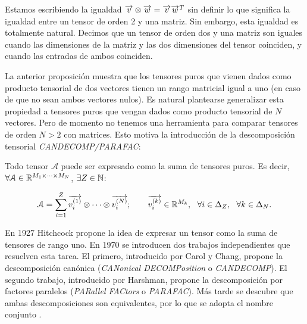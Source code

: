 \begin{observacion}
	Estamos escribiendo la igualdad $\overrightarrow{v} \otimes \overrightarrow{w} = \overrightarrow{v} \overrightarrow{w}^T$ sin definir lo que significa la igualdad entre un tensor de orden 2 y una matriz. Sin embargo, esta igualdad es totalmente natural. Decimos que un tensor de orden dos y una matriz son iguales cuando las dimensiones de la matriz y las dos dimensiones del tensor coinciden, y cuando las entradas de ambos coinciden.
\end{observacion}

La anterior proposición muestra que los tensores puros que vienen dados como producto tensorial de dos vectores tienen un rango matricial igual a uno (en caso de que no sean ambos vectores nulos). Es natural plantearse generalizar esta propiedad a tensores puros que vengan dados como producto tensorial de $N$ vectores. Pero de momento no tenemos una herramienta para comparar tensores de orden $N > 2$ con matrices. Esto motiva la introducción de la descomposición tensorial \textit{CANDECOMP/PARAFAC}:

\begin{proposicion} \label{proposicion:descomposicion_cp}
	Todo tensor $\mathcal{A}$ puede ser expresado como la suma de tensores puros. Es decir, $\forall \mathcal{A} \in \mathbb{R}^{M_1 \times \cdots \times M_N}$, $\exists Z \in \mathbb{N}$:

	\begin{equation} \label{eq:cp_decomp}
		\mathcal{A} = \sum_{i = 1}^Z \overrightarrow{v_i^{(1)}} \otimes \cdots \otimes \overrightarrow{v_i^{(N)}};
		\qquad \overrightarrow{v_i^{(k)}} \in \mathbb{R}^{M_k},
		\ \  \forall i \in \Delta_{Z},
		\ \  \forall k \in \Delta_{N}.
	\end{equation}
\end{proposicion}

\begin{observacion}
	En 1927 Hitchcock propone la idea de expresar un tensor como la suma de tensores de rango uno. En 1970 se introducen dos trabajos independientes que resuelven esta tarea. El primero, introducido por Carol y Chang, propone la descomposición canónica (\textit{CANonical DECOMPosition} o \textit{CANDECOMP}). El segundo trabajo, introducido por Harshman, propone la descomposición por factores paralelos (\textit{PARallel FACtors} o \textit{PARAFAC}). Más tarde se descubre que ambas descomposiciones son equivalentes, por lo que se adopta el nombre conjunto \cite{matematicas:cp_nombre_paper}.
\end{observacion}

